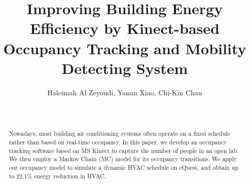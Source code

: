 \documentclass{sig-alternate}
\begin{document}
\title{Improving Building Energy Efficiency by Kinect-based Occupancy
  Tracking and Mobility Detecting System}

  
\author{\alignauthor Haleimah Al Zeyoudi, Yanan Xiao, Chi-Kin Chau \\ \quad \\ 
 \\
} 



\makeatletter
\let\@copyrightspace\relax
\makeatother





\maketitle{}



\begin{abstract}
 Nowadays, most building air conditioning systems often operate on a fixed schedule rather than based on real-time occupancy. In this paper, we develop an occupancy tracking software based on MS Kinect to capture the number of people in an open lab. We then employ a Markov Chain (MC) model for its occupancy transitions. We apply our occupancy model to simulate a dynamic HVAC schedule on eQuest, and obtain up to 22.1\% energy reduction in HVAC. 
\end{abstract}









\end{document}
